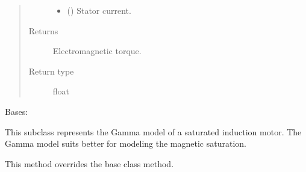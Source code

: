\documentclass[letterpaper,10pt,english]{sphinxmanual}
\begin{document}
\begin{fulllineitems}
\begin{fulllineitems}
\begin{quote}
\begin{description}
\begin{itemize}
\item {} 
\sphinxAtStartPar
{} () \textendash{} Stator current.

\end{itemize}

\item[{Returns}] \leavevmode
\sphinxAtStartPar
{} \textendash{} Electromagnetic torque.

\item[{Return type}] \leavevmode
\sphinxAtStartPar
float

\end{description}\end{quote}

\end{fulllineitems}


\end{fulllineitems}


\begin{fulllineitems}
\label{\detokenize{model:model.im_drive.MotorSaturated}}
\pysigstartsignatures
{}
\pysigstopsignatures
\sphinxAtStartPar
Bases: {\hyperref[\detokenize{model:model.im_drive.Motor}]{}}

\sphinxAtStartPar
This subclass represents the Gamma model of a saturated induction motor.
The Gamma model suits better for modeling the magnetic saturation.

\begin{fulllineitems}
\label{\detokenize{model:model.im_drive.MotorSaturated.currents}}
\pysigstartsignatures
{}
\pysigstopsignatures
\sphinxAtStartPar
This method overrides the base class method.

\end{fulllineitems}


\end{fulllineitems}
\end{document}

